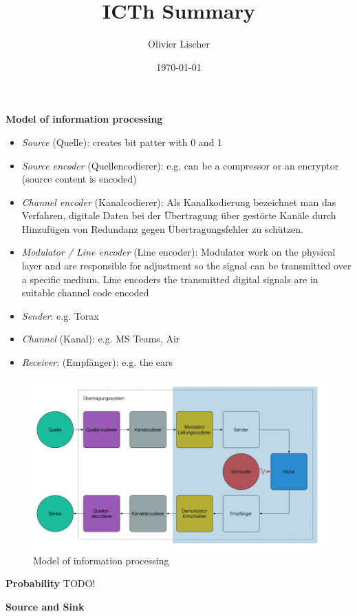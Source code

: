 \documentclass[11pt,twoside,twocolumn,landscape]{article}
\author{Olivier Lischer}
\date{\today}
\title{ICTh Summary}
\begin{document}
\pagestyle{fancy}
\fancyhf{}
\fancyfoot[CE,CO]{\leftmark}
\fancyfoot[R]{\thepage}

\textbf{Model of information processing}

\begin{itemize}
\item \emph{Source} (Quelle): creates bit patter with 0 and 1
\item \emph{Source encoder} (Quellencodierer): e.g. can be a compressor or an encryptor (source content is encoded)
\item \emph{Channel encoder} (Kanalcodierer): 
Als Kanalkodierung bezeichnet man das Verfahren, digitale Daten bei der Übertragung über gestörte Kanäle durch Hinzufügen von Redundanz gegen Übertragungsfehler zu schützen.
\item \emph{Modulator / Line encoder} (Line encoder): Modulater work on the physical layer and are responsible for adjustment so the signal can be transmitted over a specific medium. Line encoders the transmitted digital signals are in suitable channel code encoded
\item \emph{Sender}: e.g. Torax
\item \emph{Channel} (Kanal): e.g. MS Teams, Air
\item \emph{Receiver}: (Empfänger): e.g. the ears
\end{itemize}

\begin{figure}[htbp]
\centering
\includegraphics[width=.9\linewidth]{img/modell_der_informationsverarbeitung.png}
\caption{\label{fig:org4009098}Model of information processing}
\end{figure}

\textbf{Probability}
TODO!

\textbf{Source and Sink}
\end{document}

